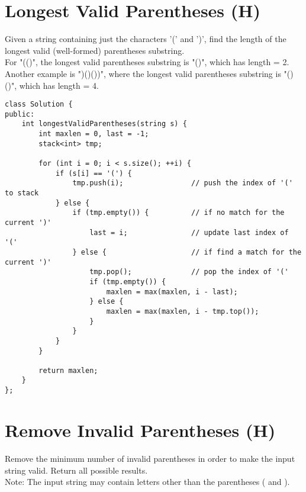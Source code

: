\section{Longest Valid Parentheses (H)}
Given a string containing just the characters '(' and ')', find the length of the longest valid (well-formed) parentheses substring. \\

For "(()", the longest valid parentheses substring is "()", which has length = 2.\\

Another example is ")()())", where the longest valid parentheses substring is "()()", which has length = 4. \\

\begin{lstlisting}
class Solution {
public:
    int longestValidParentheses(string s) {
        int maxlen = 0, last = -1;
        stack<int> tmp;
        
        for (int i = 0; i < s.size(); ++i) {
            if (s[i] == '(') {
                tmp.push(i);                // push the index of '(' to stack
            } else {
                if (tmp.empty()) {          // if no match for the current ')'
                    last = i;               // update last index of '('
                } else {                    // if find a match for the current ')'
                    tmp.pop();              // pop the index of '('
                    if (tmp.empty()) {                              
                        maxlen = max(maxlen, i - last);
                    } else {
                        maxlen = max(maxlen, i - tmp.top());
                    }
                }
            }
        }
        
        return maxlen;
    }
};
\end{lstlisting}


\section{Remove Invalid Parentheses (H)}
Remove the minimum number of invalid parentheses in order to make the input string valid. Return all possible results. \\

Note: The input string may contain letters other than the parentheses ( and ). \\

